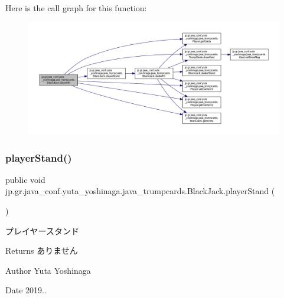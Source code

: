 Here is the call graph for this function\+:
\nopagebreak
\begin{figure}[H]
\begin{center}
\leavevmode
\includegraphics[width=350pt]{classjp_1_1gr_1_1java__conf_1_1yuta__yoshinaga_1_1java__trumpcards_1_1_black_jack_a4b8f2248ac868b5d3b9506fb0ece0ea2_cgraph}
\end{center}
\end{figure}
\mbox{\label{classjp_1_1gr_1_1java__conf_1_1yuta__yoshinaga_1_1java__trumpcards_1_1_black_jack_a53f37ae6f1388143c70a8b138c6c2443}} 
\subsubsection{\texorpdfstring{player\+Stand()}{playerStand()}}
{\footnotesize\ttfamily public void jp.\+gr.\+java\+\_\+conf.\+yuta\+\_\+yoshinaga.\+java\+\_\+trumpcards.\+Black\+Jack.\+player\+Stand (\begin{DoxyParamCaption}{ }\end{DoxyParamCaption})}



プレイヤースタンド 

\begin{DoxyReturn}{Returns}
ありません 
\end{DoxyReturn}
\begin{DoxyAuthor}{Author}
Yuta Yoshinaga 
\end{DoxyAuthor}
\begin{DoxyDate}{Date}
2019.. 
\end{DoxyDate}



